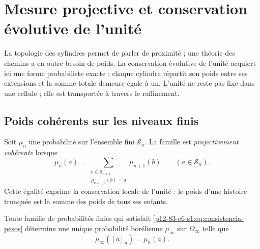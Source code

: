 \label{chap:83-06}

\section{Mesure projective et conservation évolutive de l'unité}
\label{p12-83-c6-s1:chap:medida-proyectiva}

La topologie des cylindres permet de parler de proximité ; une théorie des chemins
a en outre besoin de poids. La conservation évolutive de l'unité acquiert ici
une forme probabiliste exacte : chaque cylindre répartit son poids entre ses
extensions et la somme totale demeure égale à un. L'unité ne reste pas fixe dans
une cellule ; elle est transportée à travers le raffinement.

\subsection{Poids cohérents sur les niveaux finis}

Soit \(\mu_n\) une probabilité sur l'ensemble fini
\(\mathcal S_n\). La famille est \emph{projectivement cohérente} lorsque
\begin{equation}
 \mu_n(a)
 =\sum_{\substack{b\in\mathcal S_{n+1}\\
                   \rho_{n+1,n}(b)=a}}
   \mu_{n+1}(b)
 \qquad(a\in\mathcal S_n).
 \label{p12-83-c6-s1:eq:consistencia-pesos}
\end{equation}
Cette égalité exprime la conservation locale de l'unité : le poids d'une
histoire tronquée est la somme des poids de tous ses enfants.

\begin{theorem}
\label{p12-83-c6-s1:thm:medida-genealogica}
Toute famille de probabilités finies qui satisfait
\eqref{p12-83-c6-s1:eq:consistencia-pesos} détermine une unique probabilité borélienne
\(\mu_\infty\) sur \(\Omega_\infty\) telle que
\begin{equation}
 \mu_\infty([a]_n)=\mu_n(a).
 \label{p12-83-c6-s1:eq:medida-cilindro}
\end{equation}
\end{theorem}

